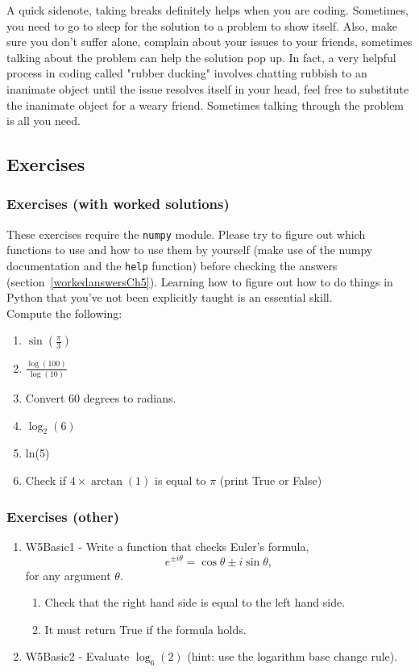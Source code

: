 \noindent A quick sidenote, taking breaks definitely helps when you are coding. Sometimes, you need to go to sleep for the solution to a problem to show itself. Also, make sure you don't suffer alone, complain about your issues to your friends, sometimes talking about the problem can help the solution pop up. In fact, a very helpful process in coding called "rubber ducking" involves chatting rubbish to an inanimate object until the issue resolves itself in your head, feel free to substitute the inanimate object for a weary friend. Sometimes talking through the problem is all you need.

\subsection{Exercises}

\subsubsection{Exercises (with worked solutions)}
\label{INeedMaths}
\noindent These exercises require the {\tt numpy} module. Please try to figure out which functions to use and how to use them by yourself (make use of the numpy documentation and the \texttt{help} function) before checking the answers (section~\ref{workedanswersCh5}). Learning how to figure out how to do things in Python that you've not been explicitly taught is an essential skill.\\

Compute the following:
\begin{enumerate}
\item $\sin(\frac{\pi}{3})$
\item $\frac{\log(100)}{\log(10)}$
\item Convert 60 degrees to radians.
\item $\log_2(6)$
\item ln(5)
\item Check if $4\times\arctan(1)$ is equal to $\pi$ (print True or False)
\end{enumerate}


\subsubsection{Exercises (other)}
\begin{enumerate}
    \item W5Basic1 - Write a function that checks Euler's formula,
    \[
    e^{\pm i\theta}=\cos \theta \pm i \sin \theta,
    \]
    for any argument $\theta$.
    \begin{enumerate} 
        \item Check that the right hand side is equal to the left hand side.
        \item It must return True if the formula holds.
    \end{enumerate}

\item W5Basic2 - Evaluate $\log_6(2)$ (hint: use the logarithm base change rule).
\end{enumerate}

